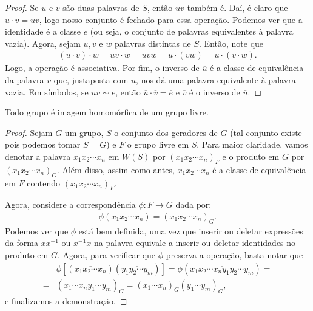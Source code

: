 	\begin{proof}
		Se $u$ e $v$ são duas palavras de $S$, então $uv$ também é. Daí, é claro que
		$\overline{u}\cdot\overline{v} = \overline{uv}$, logo nosso conjunto é fechado para essa operação. 
		Podemos ver que a identidade é a classe $\overline{e}$ (ou seja, o conjunto de palavras equivalentes
		à palavra vazia). Agora, sejam $u,v$ e $w$ palavras distintas de $S$. Então, note que
		\begin{align*}
		    (\overline{u}\cdot\overline{v})\cdot\overline{w} 
		    = \overline{uv}\cdot\overline{w} 
		    = \overline{uvw} 
		    = \overline{u}\cdot (\overline{vw}) 
		    = \overline{u}\cdot (\overline{v}\cdot\overline{w}).
		\end{align*}
		Logo, a operação é associativa. Por fim, o inverso de $\overline{u}$ é 
		a classe de equivalência da palavra $v$ que, justaposta com $u$, nos dá uma palavra equivalente 
		à palavra vazia. Em símbolos, se $uv\sim e$, então $\overline{u}\cdot\overline{v} = \overline{e}$ 
		e $\overline{v}$ é o inverso de $\overline{u}$.
	\end{proof}
	\begin{theorem}
	\label{mapeamento universal}
		Todo grupo é imagem homomórfica de um grupo livre.
	\end{theorem}
	\begin{proof}
		Sejam $G$ um grupo, $S$ o conjunto dos geradores de $G$ (tal conjunto existe pois podemos tomar $S = G$) 
		e $F$ o grupo livre em $S$. Para maior claridade, vamos denotar a palavra $x_1x_2\cdots x_n$ 
		em $W(S)$ por $(x_1x_2\cdots x_n)_F$ e o produto em $G$ por $(x_1x_2\cdots x_n)_G$. Além disso, 
		assim como antes, $\overline{x_1x_2\cdots x_n}$ é a classe de equivalência em $F$ contendo 
		$(x_1x_2\cdots x_n)_F$.
		
		\par\vspace{0.3cm} Agora, considere a correspondência $\phi: F\to G$ dada por: 
		\begin{align*}
		    \phi(\overline{x_1x_2\cdots x_n}) = (x_1x_2\cdots x_n)_G.
		\end{align*}
		Podemos ver que $\phi$ está bem definida, uma vez que inserir ou deletar 
		expressões da forma $xx^{-1}$ ou $x^{-1}x$ na palavra equivale a inserir ou deletar identidades 
		no produto em $G$. Agora, para verificar que $\phi$ preserva a operação, basta notar que
		\begin{align*}
		    &\phi[(\overline{x_1x_2\cdots x_n})(\overline{y_1y_2\cdots y_m})] 
		    = \phi(\overline{x_1x_2\cdots x_ny_1y_2\cdots y_m}) = \\ 
		    = &(x_1\cdots x_ny_1\cdots y_m)_G = (x_1\cdots x_n)_G(y_1\cdots y_m)_G,
		\end{align*}
		e finalizamos a demonstração.
	\end{proof}

